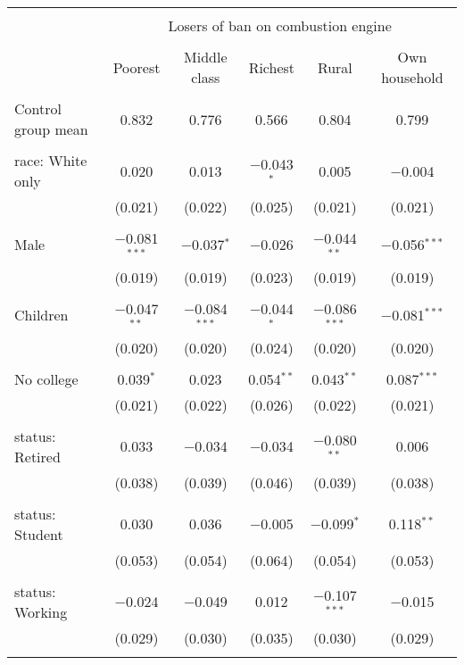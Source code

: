 
\begin{tabular}{@{\extracolsep{5pt}}lccccc} 
\\[-1.8ex]\hline 
\hline \\[-1.8ex] 
 & \multicolumn{5}{c}{Losers of ban on combustion engine} \\ 
\cline{2-6} 
\\[-1.8ex] & Poorest & Middle class & Richest & Rural & Own household \\ 
\hline \\[-1.8ex] 
 Control group mean & 0.832 & 0.776 & 0.566 & 0.804 & 0.799  \\ \hline \\[-1.8ex] race: White only & 0.020 & 0.013 & $-$0.043$^{*}$ & 0.005 & $-$0.004 \\ 
  & (0.021) & (0.022) & (0.025) & (0.021) & (0.021) \\ 
  & & & & & \\ 
 Male & $-$0.081$^{***}$ & $-$0.037$^{*}$ & $-$0.026 & $-$0.044$^{**}$ & $-$0.056$^{***}$ \\ 
  & (0.019) & (0.019) & (0.023) & (0.019) & (0.019) \\ 
  & & & & & \\ 
 Children & $-$0.047$^{**}$ & $-$0.084$^{***}$ & $-$0.044$^{*}$ & $-$0.086$^{***}$ & $-$0.081$^{***}$ \\ 
  & (0.020) & (0.020) & (0.024) & (0.020) & (0.020) \\ 
  & & & & & \\ 
 No college & 0.039$^{*}$ & 0.023 & 0.054$^{**}$ & 0.043$^{**}$ & 0.087$^{***}$ \\ 
  & (0.021) & (0.022) & (0.026) & (0.022) & (0.021) \\ 
  & & & & & \\ 
 status: Retired & 0.033 & $-$0.034 & $-$0.034 & $-$0.080$^{**}$ & 0.006 \\ 
  & (0.038) & (0.039) & (0.046) & (0.039) & (0.038) \\ 
  & & & & & \\ 
 status: Student & 0.030 & 0.036 & $-$0.005 & $-$0.099$^{*}$ & 0.118$^{**}$ \\ 
  & (0.053) & (0.054) & (0.064) & (0.054) & (0.053) \\ 
  & & & & & \\ 
 status: Working & $-$0.024 & $-$0.049 & 0.012 & $-$0.107$^{***}$ & $-$0.015 \\ 
  & (0.029) & (0.030) & (0.035) & (0.030) & (0.029) \\ 
  & & & & & \\ 

\end{tabular}
